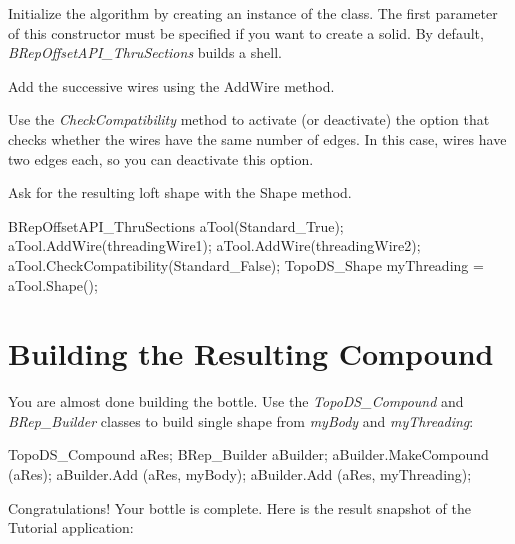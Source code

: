 \begin{DoxyItemize}
\item Initialize the algorithm by creating an instance of the class. The first parameter of this constructor must be specified if you want to create a solid. By default, {\itshape B\+Rep\+Offset\+A\+P\+I\+\_\+\+Thru\+Sections} builds a shell.
\item Add the successive wires using the Add\+Wire method.
\item Use the {\itshape Check\+Compatibility} method to activate (or deactivate) the option that checks whether the wires have the same number of edges. In this case, wires have two edges each, so you can deactivate this option.
\item Ask for the resulting loft shape with the Shape method.
\end{DoxyItemize}


\begin{DoxyCode}
BRepOffsetAPI\_ThruSections aTool(Standard\_True);
aTool.AddWire(threadingWire1); aTool.AddWire(threadingWire2);
aTool.CheckCompatibility(Standard\_False);
TopoDS\_Shape myThreading = aTool.Shape();
\end{DoxyCode}
\hypertarget{occt__tutorial_sec5}{}\section{Building the Resulting Compound}\label{occt__tutorial_sec5}
You are almost done building the bottle. Use the {\itshape Topo\+D\+S\+\_\+\+Compound} and {\itshape B\+Rep\+\_\+\+Builder} classes to build single shape from {\itshape my\+Body} and {\itshape my\+Threading}\+:


\begin{DoxyCode}
TopoDS\_Compound aRes;
BRep\_Builder aBuilder;
aBuilder.MakeCompound (aRes);
aBuilder.Add (aRes, myBody);
aBuilder.Add (aRes, myThreading);
\end{DoxyCode}


Congratulations! Your bottle is complete. Here is the result snapshot of the Tutorial application\+:


